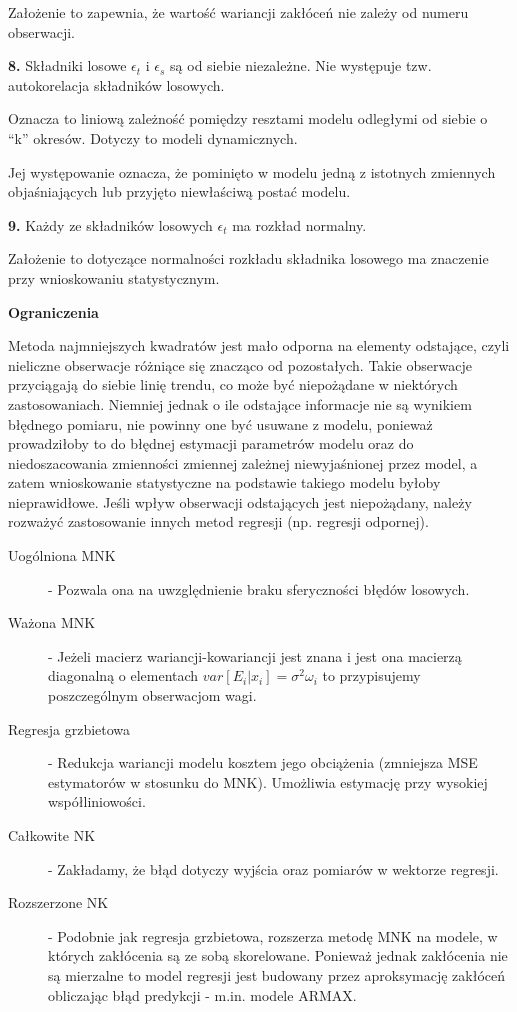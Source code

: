 Założenie to zapewnia, że wartość wariancji zakłóceń nie zależy od numeru obserwacji.

\textbf{8.} Składniki losowe $\epsilon_t$ i $\epsilon_s$ są od siebie niezależne. Nie występuje tzw. autokorelacja składników losowych.

Oznacza to liniową zależność pomiędzy resztami modelu odległymi od siebie o “k” okresów. Dotyczy to modeli dynamicznych.

Jej występowanie oznacza, że pominięto w modelu jedną z istotnych zmiennych objaśniających lub przyjęto niewłaściwą postać modelu.

\textbf{9.} Każdy ze składników losowych $\epsilon_t$ ma rozkład normalny.

Założenie to dotyczące normalności rozkładu składnika losowego ma znaczenie przy wnioskowaniu statystycznym.

\textbf{Ograniczenia}

Metoda najmniejszych kwadratów jest mało odporna na elementy odstające, czyli nieliczne obserwacje różniące się znacząco od pozostałych. Takie obserwacje przyciągają do siebie linię trendu, co może być niepożądane w niektórych zastosowaniach. Niemniej jednak o ile odstające informacje nie są wynikiem błędnego pomiaru, nie powinny one być usuwane z modelu, ponieważ prowadziłoby to do błędnej estymacji parametrów modelu oraz do niedoszacowania zmienności zmiennej zależnej niewyjaśnionej przez model, a zatem wnioskowanie statystyczne na podstawie takiego modelu byłoby nieprawidłowe. Jeśli wpływ obserwacji odstających jest niepożądany, należy rozważyć zastosowanie innych metod regresji (np. regresji odpornej).

\begin{description}
    \item[Uogólniona MNK] - Pozwala ona na uwzględnienie braku sferyczności błędów losowych. 
    \item[Ważona MNK] - Jeżeli macierz wariancji-kowariancji jest znana i jest ona macierzą diagonalną o elementach $var{[E_i|x_i]} = \sigma^2\omega_i$ to przypisujemy poszczególnym obserwacjom wagi.
    \item[Regresja grzbietowa] - Redukcja wariancji modelu kosztem jego obciążenia (zmniejsza MSE estymatorów w stosunku do MNK). Umożliwia estymację przy wysokiej współliniowości.
    \item[Całkowite NK] - Zakładamy, że błąd dotyczy wyjścia oraz pomiarów w wektorze regresji.
    \item[Rozszerzone NK] - Podobnie jak regresja grzbietowa, rozszerza metodę MNK na modele, w których zakłócenia są ze sobą skorelowane. Ponieważ jednak zakłócenia nie są mierzalne to model regresji jest budowany przez aproksymację zakłóceń obliczając błąd predykcji - m.in. modele ARMAX.
\end{description}



